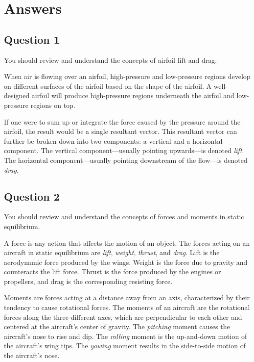 \chapter{Answers}
\label{cp:answers}
\section{Question 1}
\begin{importantbox}
    You should review and understand the concepts of airfoil lift and drag.
\end{importantbox}

When air is flowing over an airfoil, high-pressure and low-pressure regions develop on different surfaces of the airfoil based on the shape of the airfoil. A well-designed airfoil will produce high-pressure regions underneath the airfoil and low-pressure regions on top.

If one were to sum up or integrate the force caused by the pressure around the airfoil, the result would be a single resultant vector. This resultant vector can further be broken down into two components: a vertical and a horizontal component. The vertical component—usually pointing upwards—is denoted \textit{lift}. The horizontal component—usually pointing downstream of the flow—is denoted \textit{drag}.

\section{Question 2}
\begin{importantbox}
    You should review and understand the concepts of forces and moments in static equilibrium.
\end{importantbox}

A force is any action that affects the motion of an object. The forces acting on an aircraft in static equilibrium are \textit{lift}, \textit{weight}, \textit{thrust}, and \textit{drag}. Lift is the aerodynamic force produced by the wings. Weight is the force due to gravity and counteracts the lift force. Thrust is the force produced by the engines or propellers, and drag is the corresponding resisting force.

Moments are forces acting at a distance away from an axis, characterized by their tendency to cause rotational forces. The moments of an aircraft are the rotational forces along the three different axes, which are perpendicular to each other and centered at the aircraft's center of gravity. The \textit{pitching} moment causes the aircraft's nose to rise and dip. The \textit{rolling} moment is the up-and-down motion of the aircraft's wing tips. The \textit{yawing} moment results in the side-to-side motion of the aircraft's nose.

